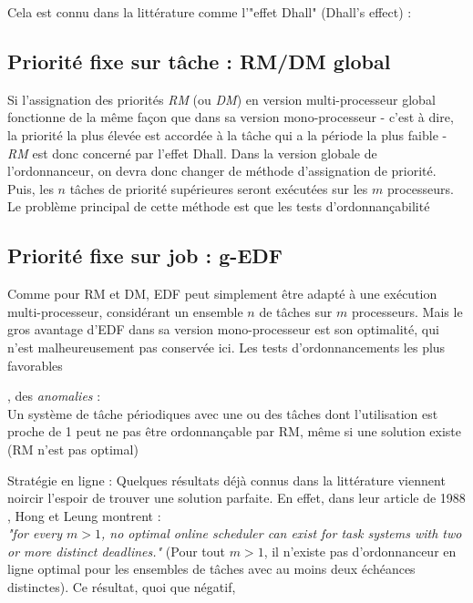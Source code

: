 \documentclass[11pt,a4paper,oneside]{report}
\begin{document}
Cela est connu dans la littérature comme l'"effet Dhall" (Dhall's effect) : \\

\subsection{Priorité fixe sur tâche : RM/DM global}
Si l'assignation des priorités \textit{RM} (ou \textit{DM}) en version multi-processeur global 
fonctionne de la même façon que dans sa version mono-processeur - 
c'est à dire, la priorité la plus élevée est accordée à la tâche qui a la période la plus faible - 
\textit{RM} est donc concerné par l'effet Dhall. 
Dans la version globale de l'ordonnanceur, on devra donc changer de méthode d'assignation de priorité.
Puis, les $n$ tâches de priorité supérieures seront exécutées sur les $m$ processeurs. \\

Le problème principal de cette méthode est que les tests d'ordonnançabilité 


\subsection{Priorité fixe sur job : g-EDF}
Comme pour RM et DM, EDF peut simplement être adapté à une exécution multi-processeur, 
considérant un ensemble $n$ de tâches sur $m$ processeurs. Mais le gros avantage d'EDF 
dans sa version mono-processeur est son optimalité, qui n'est malheureusement pas conservée ici. 
Les tests d'ordonnancements les plus favorables %





, des \textit{anomalies} : \cite{dhall_real-time_1978}\\
Un système de tâche périodiques avec une ou des tâches dont l'utilisation est proche de 1 
peut ne pas être ordonnançable par RM, même si une solution existe (RM n'est pas optimal)


Stratégie en ligne :
Quelques résultats déjà connus dans la littérature viennent noircir l'espoir de trouver une 
solution parfaite. En effet, dans leur article de 1988 \cite{hong_-line_1988}, Hong et Leung montrent :\\
\textit{"for every $m > 1$, no optimal online scheduler can exist for task systems with two or more distinct
	deadlines."} (Pour tout $m > 1$, il n'existe pas d'ordonnanceur en ligne 
optimal pour les ensembles de tâches avec au moins deux échéances distinctes). 
Ce résultat, quoi que négatif, 
\end{document}
